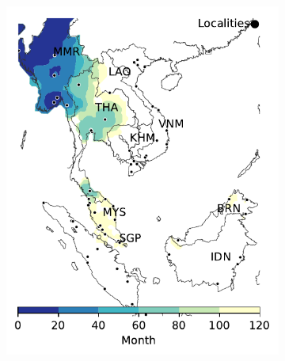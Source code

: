 \documentclass[11pt]{article}
\theoremstyle{definition}
\begin{document}
\begin{figure}[ht]
\begin{subfigure}[b]{.2\textwidth}
    \includegraphics[width=\textwidth]{MSA_model-B_m1_l3.pdf}
    \caption{\label{fig:msaClassB}} %
\end{subfigure}
\begin{subfigure}[b]{.135\textwidth}

\end{subfigure}
\end{figure}
\end{document}
